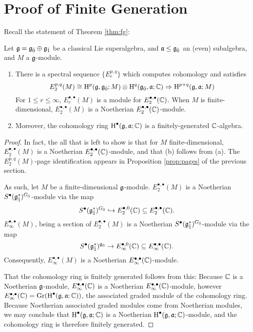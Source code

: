 \section{Proof of Finite Generation}
\label{sec:fg-proof}

Recall the statement of Theorem \ref{thm:fg}:


\begin{theorem}
  Let $\mathfrak{g} = {\mathfrak{g}}_{\bar{0}} \oplus {\mathfrak{g}}_{\bar{1}}$ be a classical Lie superalgebra, and $\mathfrak{a} \leq {\mathfrak{g}}_{\bar{0}}$ an (even) subalgebra, and $M$ a $\mathfrak{g}$-module.
  \begin{enumerate}[\indent\rm (a)]
    \item There is a spectral sequence $\{E_r^{p,q}\}$ which computes cohomology and satisfies
  \[
    E_2^{p,q}(M) \cong \operatorname{H}^p(\mathfrak{g},{\mathfrak{g}}_{\bar{0}};M) \otimes \operatorname{H}^q({\mathfrak{g}}_{\bar{0}},\mathfrak{a};\mathbb{C}) \Rightarrow \operatorname{H}^{p+q}(\mathfrak{g},\mathfrak{a};M)
  \]
  For $1 \leq r \leq \infty$, $E_r^{\bullet,\bullet}(M)$ is a module for $E_2^{\bullet,\bullet}(\mathbb{C})$. When $M$ is finite-dimensional, $E_2^{\bullet,\bullet}(M)$ is a Noetherian $E_2^{\bullet,\bullet}(\mathbb{C})$-module.
    \item Moreover, the cohomology ring $\operatorname{H}^\bullet(\mathfrak{g},\mathfrak{a};\mathbb{C})$ is a finitely-generated $\mathbb{C}$-algebra.
  \end{enumerate}
\end{theorem}

\begin{proof}
  In fact, the all that is left to show is that for $M$ finite-dimensional, $E_2^{\bullet,\bullet}(M)$ is a Noetherian $E_2^{\bullet,\bullet}(\mathbb{C})$-module, and that (b) follows from (a). The $E_2^{p,q}(M)$-page identification appears in Proposition \ref{prop:pages} of the previous section.

    As such, let $M$ be a finite-dimensional $\mathfrak{g}$-module. $E_2^{\bullet,\bullet}(M)$ is a Noetherian $S^\bullet({\mathfrak{g}}_{\bar{1}}^*)^{{G}_{\bar{0}}}$-module via the map
  \[
    S^\bullet({\mathfrak{g}}_{\bar{1}}^*)^{{G}_{\bar{0}}} \hookrightarrow E_2^{\bullet,0}(\mathbb{C}) \subseteq E_2^{\bullet,\bullet}(\mathbb{C}).
  \]
  $E_\infty^{\bullet,\bullet}(M)$, being a section of $E_2^{\bullet,\bullet}(M)$ is a Noetherian $S^\bullet({\mathfrak{g}}_{\bar{1}}^*)^{{G}_{\bar{0}}}$-module via the map
  \[
    S^\bullet({\mathfrak{g}}_{\bar{1}}^*)^{{\mathfrak{g}}_{\bar{0}}} \to E_\infty^{\bullet,0}(\mathbb{C}) \subseteq E_\infty^{\bullet,\bullet}(\mathbb{C}).
  \]
  Consequently, $E_\infty^{\bullet,\bullet}(M)$ is a Noetherian $E_\infty^{\bullet,\bullet}(\mathbb{C})$-module.

That the cohomology ring is finitely generated follows from this: Because $\mathbb{C}$ is a Noetherian $\mathfrak{g}$-module,  $E_\infty^{\bullet,\bullet}(\mathbb{C})$ is a Noetherian $E_\infty^{\bullet,\bullet}(\mathbb{C})$-module, however $E_\infty^{\bullet,\bullet}(\mathbb{C}) = \operatorname{Gr}(\operatorname{H}^\bullet(\mathfrak{g},\mathfrak{a};\mathbb{C}))$, the associated graded module of the cohomology ring. Because Noetherian associated graded modules come from Noetherian modules, we may conclude that $\operatorname{H}^\bullet(\mathfrak{g},\mathfrak{a};\mathbb{C})$ is a Noetherian $\operatorname{H}^\bullet(\mathfrak{g},\mathfrak{a};\mathbb{C})$-module, and the cohomology ring is therefore finitely generated.
\end{proof}

